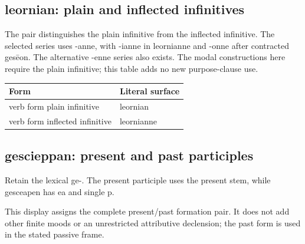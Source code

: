 \subsection*{leornian: plain and inflected infinitives}

The pair distinguishes the plain infinitive from the inflected infinitive. The selected series uses -anne, with -ianne in leornianne and -onne after contracted gesēon. The alternative -enne series also exists. The modal constructions here require the plain infinitive; this table adds no new purpose-clause use.

\par\begingroup
\fontsize{10.5}{13.2}\selectfont
\setlength{\LTleft}{0pt}\setlength{\LTright}{\fill}
\noindent
\begin{tabular}{@{}>{\raggedright\arraybackslash}p{73.68mm}>{\raggedright\arraybackslash}p{47.51mm}@{}}
\toprule
\textbf{Form} & \textbf{Literal surface} \\
\midrule
verb form plain infinitive & leornian \\
verb form inflected infinitive & leornianne \\
\bottomrule
\end{tabular}
\par\endgroup

\subsection*{gescieppan: present and past participles}

Retain the lexical ge-. The present participle uses the present stem, while gesceapen has ea and single p.

This display assigns the complete present/\allowbreak{}past formation pair. It does not add other finite moods or an unrestricted attributive declension; the past form is used in the stated passive frame.

